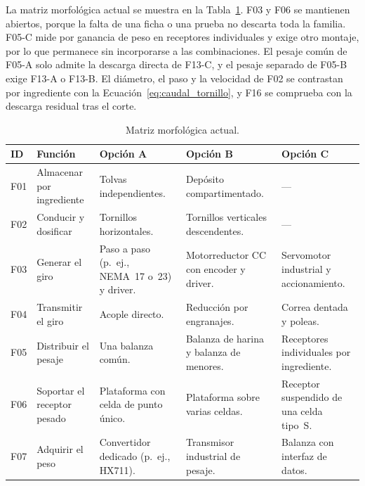 La matriz morfológica actual se muestra en la
Tabla~\ref{tab:morfologia_actual}. F03 y F06 se mantienen abiertos,
porque la falta de una ficha o una prueba no descarta toda la familia.
F05-C mide por ganancia de peso en receptores individuales y exige otro
montaje, por lo que permanece sin incorporarse a las combinaciones. El
pesaje común de F05-A solo admite la descarga directa de F13-C, y el
pesaje separado de F05-B exige F13-A o F13-B. El diámetro, el paso y la
velocidad de F02 se contrastan por ingrediente con la
Ecuación~\eqref{eq:caudal_tornillo}, y F16 se comprueba con la descarga
residual tras el corte.

\begin{table}[H]
    \centering
    \caption{Matriz morfológica actual.}
    \label{tab:morfologia_actual}
    \footnotesize
    \setlength{\tabcolsep}{2.5pt}
    \renewcommand{\arraystretch}{1.15}
    \begin{tabularx}{\textwidth}{p{}>{\raggedright\arraybackslash}p{}*{3}{>{\raggedright\arraybackslash}X}}
        \toprule
        \textbf{ID} & \textbf{Función} & \textbf{Opción A} & \textbf{Opción B} & \textbf{Opción C} \\
        \midrule
        F01 & Almacenar por ingrediente & Tolvas independientes. & Depósito compartimentado. & --- \\
        \addlinespace[2pt]
        F02 & Conducir y dosificar & Tornillos horizontales. & Tornillos verticales descendentes. & --- \\
        \addlinespace[2pt]
        F03 & Generar el giro & Paso a paso (p.~ej., NEMA~17 o~23) y driver. & Motorreductor CC con encoder y driver. & Servomotor industrial y accionamiento. \\
        \addlinespace[2pt]
        F04 & Transmitir el giro & Acople directo. & Reducción por engranajes. & Correa dentada y poleas. \\
        \addlinespace[2pt]
        F05 & Distribuir el pesaje & Una balanza común. & Balanza de harina y balanza de menores. & Receptores individuales por ingrediente. \\
        \addlinespace[2pt]
        F06 & Soportar el receptor pesado & Plataforma con celda de punto único. & Plataforma sobre varias celdas. & Receptor suspendido de una celda tipo~S. \\
        \addlinespace[2pt]
        F07 & Adquirir el peso & Convertidor dedicado (p.~ej., HX711). & Transmisor industrial de pesaje. & Balanza con interfaz de datos. \\

\end{tabularx}
\end{table}

